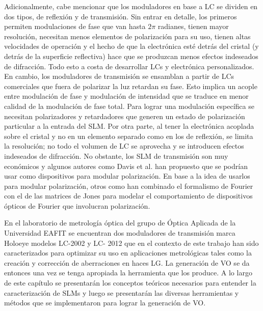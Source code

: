 Adicionalmente, cabe mencionar que los moduladores en base a LC se
dividen en dos tipos, de reflexión y de transmisión. Sin entrar en
detalle, los primeros permiten modulaciones de fase que van hasta $2\pi$
radianes, tienen mayor resolución, necesitan menos elementos de
polarización para su uso, tienen altas velocidades de operación y el
hecho de que la electrónica esté detrás del cristal (y detrás de la
superficie reflectiva) hace que se produzcan menos efectos indeseados
de difracción. Todo esto a costa de desarrollar LCs y
electrónica personalizados. En cambio, los moduladores de transmisión
se ensamblan a partir de LCs comerciales que fuera de polarizar la luz
retardan su fase. Esto implica un acople entre modulación de fase y 
modulación de intensidad que se traduce en menor calidad de la
modulación de fase total. Para lograr una modulación específica se
necesitan polarizadores y retardadores que generen un 
estado de polarización particular a la entrada del SLM. Por otra
parte, al tener la electrónica acoplada sobre el cristal y no en un
elemento separado como en los de reflexión, se limita la
resolución; no todo el volumen de LC se aprovecha y se introducen
efectos indeseados de difracción. 
No obstante, los SLM de transmisión son muy económicos y algunos
autores como Davis et al.  han propuesto
que se podrían usar como dispositivos para modular polarización. En
base a la idea de usarlos para modular polarización, otros como  han
combinado el formalismo de Fourier con el de las matrices de Jones
para modelar el comportamiento de dispositivos ópticos de Fourier que
involucran polarización. 

En el laboratorio de metrología óptica del grupo de Óptica Aplicada de
la Universidad EAFIT se encuentran dos moduladores de transmisión
marca Holoeye modelos LC-2002 y LC- 2012 que en el contexto de este
trabajo han sido caracterizados para optimizar su uso en aplicaciones metrológicas
tales como la creación y corrección de aberraciones en haces LG.  
La generación de VO se da entonces una vez se tenga apropiada la
herramienta que los produce.  
A lo largo de este capítulo se presentarán los conceptos teóricos
necesarios para entender la caracterización de SLMs y luego se
presentarán las diversas herramientas y métodos que se implementaron
para lograr la generación de VO.


